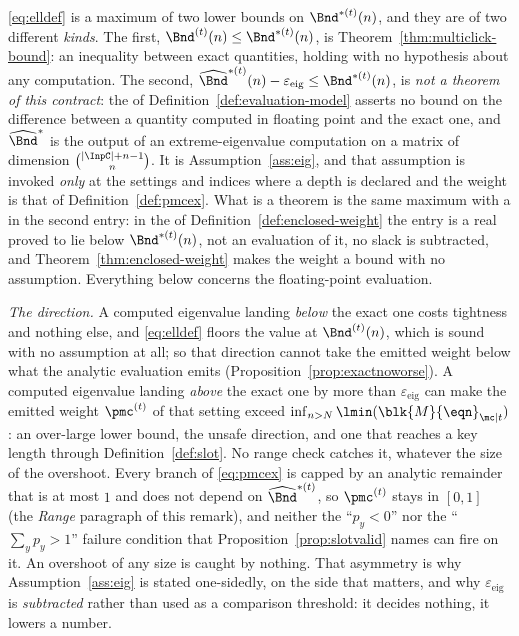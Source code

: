 \begin{remark}
\label{rem:exacteig}
\eqref{eq:elldef} is a maximum of two lower bounds on $\Bnd^{\ast(t)}(n)$,
and they are of two different \emph{kinds}. The first,
$\Bnd^{(t)}(n)\le\Bnd^{\ast(t)}(n)$, is Theorem~\ref{thm:multiclick-bound}: an
inequality between exact quantities, holding with no hypothesis about any
computation. The second,
$\widehat\Bnd^{\ast(t)}(n)-\varepsilon_{\mathrm{eig}}\le\Bnd^{\ast(t)}(n)$,
is \emph{not a theorem of this contract}:
the  of Definition~\ref{def:evaluation-model} asserts no bound on
the difference between a quantity computed in floating point and the exact
one, and $\widehat\Bnd^{\ast}$ is the output
of an extreme-eigenvalue computation on a matrix of dimension
$\binom{|\InpC|+n-1}{n}$. It is Assumption~\ref{ass:eig}, and that
assumption is invoked \emph{only} at the settings and indices where a depth
is declared and the weight is that of Definition~\ref{def:pmcex}. What is a
theorem is the same maximum with a  in the second entry: in the  of
Definition~\ref{def:enclosed-weight} the entry is a real proved to lie below
$\Bnd^{\ast(t)}(n)$, not an evaluation of it, no slack is subtracted, and
Theorem~\ref{thm:enclosed-weight} makes the weight a bound with no assumption.
Everything below concerns the floating-point evaluation.

\emph{The direction.} A computed eigenvalue landing \emph{below} the exact
one costs tightness and nothing else, and \eqref{eq:elldef} floors the value
at $\Bnd^{(t)}(n)$, which is sound with no assumption at all; so that
direction cannot take the emitted weight below what the analytic evaluation
emits (Proposition~\ref{prop:exactnoworse}). A computed eigenvalue landing
\emph{above} the exact one by more than $\varepsilon_{\mathrm{eig}}$ can make
the emitted weight $\pmc^{(t)}$ of that setting exceed
$\inf_{n>N}\lmin(\blk{M}{\eqn}_{\mc|t})$: an over-large lower bound, the
unsafe direction, and one that reaches a key length through
Definition~\ref{def:slot}. No range check catches it, whatever the size of
the overshoot. Every branch of \eqref{eq:pmcex} is capped by an analytic
remainder that is at most $1$ and does not depend on
$\widehat\Bnd^{\ast(t)}$, so $\pmc^{(t)}$ stays in $[0,1]$ (the
\emph{Range} paragraph of this remark), and neither the ``$p_y<0$'' nor the
``$\sum_yp_y>1$'' failure condition that Proposition~\ref{prop:slotvalid}
names can fire on it. An overshoot of any size is caught by nothing. That
asymmetry is why Assumption~\ref{ass:eig} is
stated one-sidedly, on the side that matters, and why
$\varepsilon_{\mathrm{eig}}$ is \emph{subtracted} rather than used as a
comparison threshold: it decides nothing, it lowers a number.


\end{remark}
